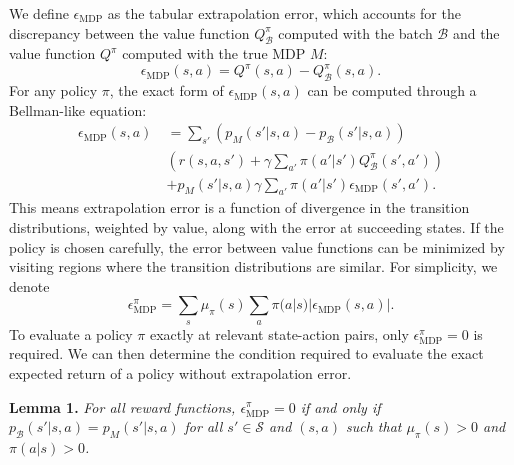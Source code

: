 \documentclass{article}
\newcommand{\e}{\epsilon}
\newcommand{\y}{\gamma}
\newcommand{\lp}{\left (}
\newcommand{\rp}{\right )}
\newcommand{\B}{\mathcal{B}}
\begin{document}
We define $\e_\text{MDP}$ as the tabular extrapolation error, which accounts for the discrepancy between the value function $Q^\pi_\B$ computed with the batch $\B$ and the value function $Q^\pi$ computed with the true MDP $M$:
\begin{equation} \label{MDP}
    \e_{\text{MDP}}(s,a) = Q^\pi(s,a) - Q^\pi_\B(s,a).
\end{equation}
For any policy $\pi$, the exact form of $\e_{\text{MDP}}(s,a)$ can be computed through a Bellman-like equation:  
\begin{equation}
\begin{split}
\e_{\text{MDP}}(s,a)~&= \sum_{s'} \lp p_M(s'|s,a) - p_\B(s'|s,a) \rp \\
&\lp r(s,a,s') + \y \sum_{a'} \pi(a'|s') Q^\pi_\B(s',a') \rp \\
&+ p_M(s'|s,a) \y \sum_{a'} \pi(a'|s') \e_{\text{MDP}}(s',a').
\end{split}
\end{equation}
This means extrapolation error is a function of divergence in the transition distributions, weighted by value, along with the error at succeeding states. If the policy is chosen carefully, the error between value functions can be minimized by visiting regions where the transition distributions are similar. For simplicity, we denote 
\begin{equation}
    \e^\pi_{\text{MDP}} = \sum_s \mu_\pi(s) \sum_a \pi(a|s) |\e_{\text{MDP}}(s,a)|.
\end{equation}
To evaluate a policy $\pi$ exactly at relevant state-action pairs, only $\e^\pi_{\text{MDP}} = 0$ is required. We can then determine the condition required to evaluate the exact expected return of a policy without extrapolation error.

\textbf{Lemma 1.} \textit{For all reward functions, $\e^\pi_{\text{MDP}} = 0$ if and only if $p_\B(s'|s,a) = p_M(s'|s,a)$ for all $s' \in \mathcal{S}$ and $(s,a)$ such that $\mu_\pi(s) > 0$ and $\pi(a|s) > 0$.}
\end{document}
